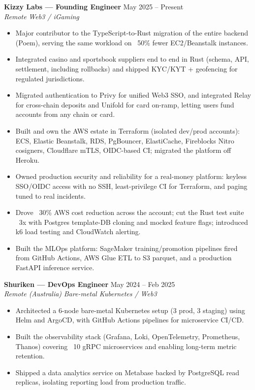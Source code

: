 \documentclass[10pt,letterpaper]{article}
\newcommand{\role}[4]{%
  \noindent\textbf{#1} \hfill #2\\
  \textit{#3} \hfill \textit{#4}\par\vspace{0pt}%
}
\begin{document}
\role{Kizzy Labs --- Founding Engineer}{May 2025 -- Present}{Remote}{Web3 / iGaming}
\begin{itemize}
  \item Major contributor to the TypeScript-to-Rust migration of the entire backend (Poem), serving the same workload on ~50\% fewer EC2/Beanstalk instances.
  \item Integrated casino and sportsbook suppliers end to end in Rust (schema, API, settlement, including rollbacks) and shipped KYC/KYT + geofencing for regulated jurisdictions.
  \item Migrated authentication to Privy for unified Web3 SSO, and integrated Relay for cross-chain deposits and Unifold for card on-ramp, letting users fund accounts from any chain or card.
  \item Built and own the AWS estate in Terraform (isolated dev/prod accounts): ECS, Elastic Beanstalk, RDS, PgBouncer, ElastiCache, Fireblocks Nitro cosigners, Cloudflare mTLS, OIDC-based CI; migrated the platform off Heroku.
  \item Owned production security and reliability for a real-money platform: keyless SSO/OIDC access with no SSH, least-privilege CI for Terraform, and paging tuned to real incidents.
  \item Drove ~30\% AWS cost reduction across the account; cut the Rust test suite ~3x with Postgres template-DB cloning and mocked feature flags; introduced k6 load testing and CloudWatch alerting.
  \item Built the MLOps platform: SageMaker training/promotion pipelines fired from GitHub Actions, AWS Glue ETL to S3 parquet, and a production FastAPI inference service.
\end{itemize}

\role{Shuriken --- DevOps Engineer}{May 2024 -- Feb 2025}{Remote (Australia)}{Bare-metal Kubernetes / Web3}
\begin{itemize}
  \item Architected a 6-node bare-metal Kubernetes setup (3 prod, 3 staging) using Helm and ArgoCD, with GitHub Actions pipelines for microservice CI/CD.
  \item Built the observability stack (Grafana, Loki, OpenTelemetry, Prometheus, Thanos) covering ~10 gRPC microservices and enabling long-term metric retention.
  \item Shipped a data analytics service on Metabase backed by PostgreSQL read replicas, isolating reporting load from production traffic.
\end{itemize}
\end{document}
